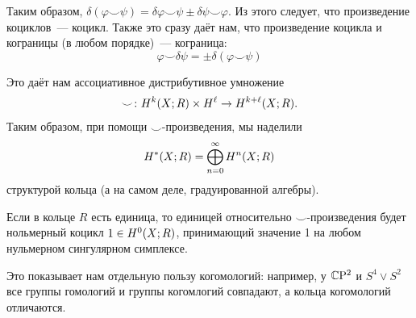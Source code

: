     \begin{remark}
       Таким образом, $\delta (\varphi \smile \psi) = \delta \varphi \smile \psi \pm \delta \psi \smile \varphi$. Из этого следует, что произведение коциклов~--- коцикл.
       Также это сразу даёт нам, что произведение коцикла и кограницы (в любом порядке)~--- кограница:
        \[ \varphi \smile \delta \psi = \pm \delta(\varphi \smile \psi)\]

        Это даёт нам ассоциативное дистрибутивное умножение
        \[ \smile \colon H^{k}\lr*{X; R} \times H^{\ell} \to H^{k + \ell} \lr*{X; R}. \]
        Таким образом, при помощи $\smile$-произведения, мы наделили \[ H^{*}\lr*{X; R} = \bigoplus_{n = 0}^{\infty} H^{n}\lr*{X; R} \] структурой кольца (а на самом деле, градуированной алгебры).

        Если в кольце $R$ есть единица, то единицей относительно $\smile$-произведения будет нольмерный коцикл $1 \in H^{0}\lr*{X; R}$, принимающий значение 1 на любом нульмерном сингулярном симплексе.
        
    \end{remark}
    
    \begin{remark}
       Это показывает нам отдельную пользу когомологий: например, у $\mathbb{C} \mathrm{P}^2$ и $S^4 \vee S^2$  все группы гомологий и группы когомлогий совпадают, а кольца когомологий отличаются.
    \end{remark}   
    








